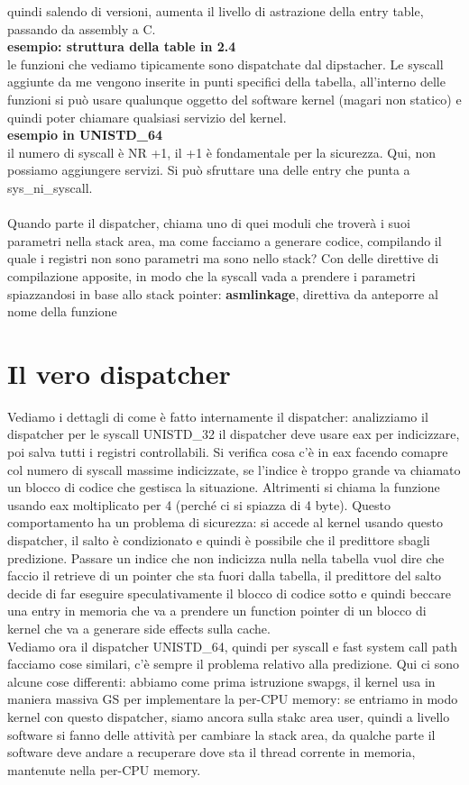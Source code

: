 \documentclass[12pt, oneside]{extbook}
\begin{document}
quindi salendo di versioni, aumenta il livello di astrazione della entry table, passando da assembly a C.\\
\textbf{esempio: struttura della table in 2.4}\\
le funzioni che vediamo tipicamente sono dispatchate dal dipstacher. Le syscall aggiunte da me vengono inserite in punti specifici della tabella, all'interno delle funzioni si può usare qualunque oggetto del software kernel (magari non statico) e quindi poter chiamare qualsiasi servizio del kernel.\\
\textbf{esempio in UNISTD\_64}\\
il numero di syscall è NR +1, il +1 è fondamentale per la sicurezza. Qui, non possiamo aggiungere servizi. Si può sfruttare una delle entry che punta a sys\_ni\_syscall.\\\\ Quando parte il dispatcher, chiama uno di quei moduli che troverà i suoi parametri nella stack area, ma come facciamo a generare codice, compilando il quale i registri non sono parametri ma sono nello stack? Con delle direttive di compilazione apposite, in modo che la syscall vada a prendere i parametri spiazzandosi in base allo stack pointer: \textbf{asmlinkage}, direttiva da anteporre al nome della funzione
\section{Il vero dispatcher}
Vediamo i dettagli di come è fatto internamente il dispatcher: analizziamo il dispatcher per le syscall UNISTD\_32
il dispatcher deve usare eax per indicizzare, poi salva tutti i registri controllabili. Si verifica cosa c'è in eax facendo comapre col numero di syscall massime indicizzate, se l'indice è troppo grande va chiamato un blocco di codice che gestisca la situazione. Altrimenti si chiama la funzione usando eax moltiplicato per 4 (perché ci si spiazza di 4 byte). Questo comportamento ha un problema di sicurezza: si accede al kernel usando questo dispatcher, il salto è condizionato e quindi è possibile che il predittore sbagli predizione. Passare un indice che non indicizza nulla nella tabella vuol dire che faccio il retrieve di un pointer che sta fuori dalla tabella, il predittore del salto decide di far eseguire speculativamente il blocco di codice sotto e quindi beccare una entry in memoria che va a prendere un function pointer di un blocco di kernel che va a generare side effects sulla cache.\\ Vediamo ora il dispatcher UNISTD\_64, quindi per syscall e fast system call path
facciamo cose similari, c'è sempre il problema relativo alla predizione. Qui ci sono alcune cose differenti: abbiamo come prima istruzione swapgs, il kernel usa in maniera massiva GS per implementare la per-CPU memory: se entriamo in modo kernel con questo dispatcher, siamo ancora sulla stakc area user, quindi a livello software si fanno delle attività per cambiare la stack area, da qualche parte il software deve andare a recuperare dove sta il thread corrente in memoria, mantenute nella per-CPU memory.\\
\end{document}
